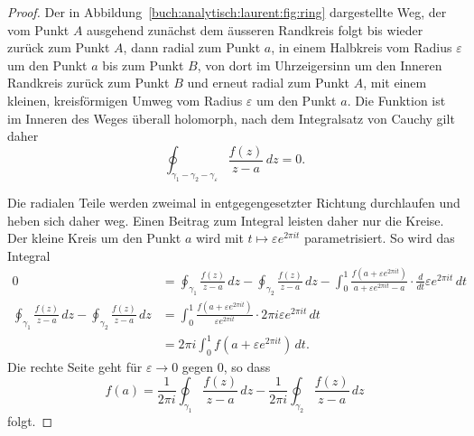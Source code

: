 \begin{proof}
Der in Abbildung~\ref{buch:analytisch:laurent:fig:ring} dargestellte
Weg, der vom Punkt $A$ ausgehend zunächst dem äusseren Randkreis
folgt bis wieder zurück zum Punkt $A$, dann radial zum Punkt $a$, in 
einem Halbkreis vom Radius $\varepsilon$ um den Punkt $a$ bis zum
Punkt $B$, von dort im Uhrzeigersinn um den Inneren Randkreis zurück
zum Punkt $B$ und erneut radial zum Punkt $A$, mit einem kleinen, 
kreisförmigen Umweg vom Radius $\varepsilon$ um den Punkt $a$.
Die Funktion ist im Inneren des Weges überall holomorph,
nach dem Integralsatz von Cauchy gilt daher
\[
\oint_{\gamma_1-\gamma_2-\gamma_{\varepsilon}} \frac{f(z)}{z-a}\,dz 
=
0.
\]

Die radialen Teile werden zweimal in entgegengesetzter Richtung durchlaufen
und heben sich daher weg.
Einen Beitrag zum Integral leisten daher nur die Kreise.
Der kleine Kreis um den Punkt $a$ wird mit $t\mapsto \varepsilon e^{2\pi it}$
parametrisiert.
So wird das Integral
\begin{align*}
0
&=
\oint_{\gamma_1} \frac{f(z)}{z-a}\,dz
-
\oint_{\gamma_2} \frac{f(z)}{z-a}\,dz
-
\int_0^1
\frac{f(a+\varepsilon e^{2\pi it})}{a+\varepsilon e^{2\pi it}-a}
\cdot
\frac{d}{dt}
\varepsilon
e^{2\pi it}
\,dt
\\
\oint_{\gamma_1} \frac{f(z)}{z-a}\,dz
-
\oint_{\gamma_2} \frac{f(z)}{z-a}\,dz
&=
\int_0^1
\frac{f(a+\varepsilon e^{2\pi it})}{\varepsilon e^{2\pi it}}
\cdot
2\pi i\varepsilon e^{2\pi it}
\,dt
\\
&=
2\pi i
\int_0^1
f(a+\varepsilon e^{2\pi it})
\,dt.
\end{align*}
Die rechte Seite geht für $\varepsilon\to 0$ gegen $0$, so dass
\[
f(a)
=
\frac{1}{2\pi i}
\oint_{\gamma_1}
\frac{f(z)}{z-a}
\,dz
-
\frac{1}{2\pi i}
\oint_{\gamma_2}
\frac{f(z)}{z-a}
\,dz
\]
folgt.
\end{proof}
